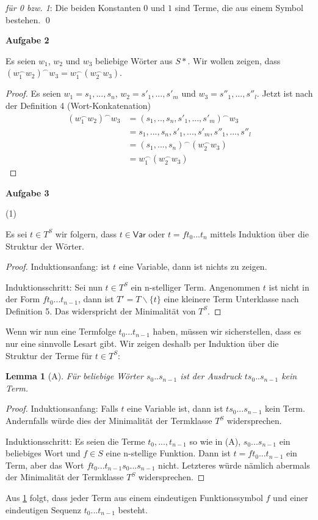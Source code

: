 \documentclass{article}
\theoremstyle{definition}
\theoremstyle{plain}
\newtheorem{lem}[thm]{Lemma}
\theoremstyle{remark}
\newcommand{\aufgabe}[1]{
  {
  \vspace*{0.5cm}
  \textsf{\textbf{Aufgabe #1}}
  \vspace*{0.2cm}
  
  }
}
\newcommand{\unteraufgabe}[1]{
  {
  \vspace*{0.2cm}
	\noindent\textsf{(#1)}
  }
}
\newcommand{\induktionsanfang}{
  {
  \vspace*{0.1cm}
  \noindent
  \textsf{Induktionsanfang:}
  }
}
\newcommand{\induktionsschritt}{
  {
  \vspace*{0.1cm}
  \noindent
  \textsf{Induktionsschritt:}
  }
}
\begin{document}
\emph{für 0 bzw. 1}: Die beiden Konstanten $0$ und $1$ sind Terme, die aus einem Symbol bestehen. \qed

\aufgabe2
Es seien $w_1$, $w_2$ und $w_3$ beliebige Wörter aus $S*$. Wir wollen zeigen, dass 
$(w_1^{\smallfrown}w_2)^{\smallfrown}w_3=w_1^{\smallfrown}(w_2^{\smallfrown}w_3)$.
\begin{proof}
	Es seien $w_1=s_1,...,s_n$, $w_2=s'_{1},...,s'_m$ und $w_3=s''_{1},...,s''_l$.
	Jetzt ist nach der Definition 4 (Wort-Konkatenation)
	\begin{align}
		(w_1^{\smallfrown}w_2)^{\smallfrown}w_3&=(s_1,..,s_n,s'_{1},...,s'_m)^{\smallfrown}w_3\\
						       &= s_1,...,s_n,s'_{1},...,s'_m,s''_{1},...,s''_l \\
						       &=(s_1,...,s_n)^{\smallfrown}(w_2^{\smallfrown}w_3)\\
						       &=w_1^{\smallfrown}(w_2^{\smallfrown}w_3)
	\end{align}
\end{proof}
\aufgabe3
\unteraufgabe1
Es sei $t\in T^S$ wir folgern, dass $t\in \mathsf{Var}$ oder $t=ft_0...t_n$ mittels Induktion über die Struktur der Wörter. \smallskip
\begin{proof}
\induktionsanfang ist $t$ eine Variable, dann ist nichts zu zeigen. \smallskip

\induktionsschritt Sei nun $t\in T^S$ ein n-stelliger Term. Angenommen $t$ ist nicht in der Form $ft_0...t_{n-1}$, dann ist $T'= T\backslash \{t\}$ eine kleinere Term Unterklasse nach Definition 5. Das widerspricht der Minimalität von $T^S$.
\end{proof}
Wenn wir nun eine Termfolge $t_0...t_{n-1}$ haben, müssen wir sicherstellen, dass es nur eine sinnvolle Lesart gibt. Wir zeigen deshalb per Induktion über die Struktur der Terme für $t\in T^S$: 
\begin{lem}[A]\label{lemmaA}
	Für beliebige Wörter $s_0..s_{n-1}$ ist der Ausdruck $ts_0..s_{n-1}$ kein Term. 
\end{lem}
\begin{proof}
\induktionsanfang Falls $t$ eine Variable ist, dann ist $ts_0...s_{n-1}$ kein Term. Andernfalls würde dies der Minimalität der Termklasse $T^S$ widersprechen.

\induktionsschritt Es seien die Terme $t_0,...,t_{n-1}$ so wie in (A), $s_0...s_{n-1}$ ein beliebiges Wort und $f\in S$ eine n-stellige Funktion. 
Dann ist $t=ft_0...t_{n-1}$ ein Term, aber das Wort $ft_0...t_{n-1}s_0...s_{n-1}$ nicht. Letzteres würde nämlich abermals der Minimalität der Termklasse $T^S$ widersprechen.
\end{proof}
Aus \cref{lemmaA} folgt, dass jeder Term aus einem eindeutigen Funktionssymbol $f$ und einer eindeutigen Sequenz $t_0...t_{n-1}$ besteht.
\end{document}
